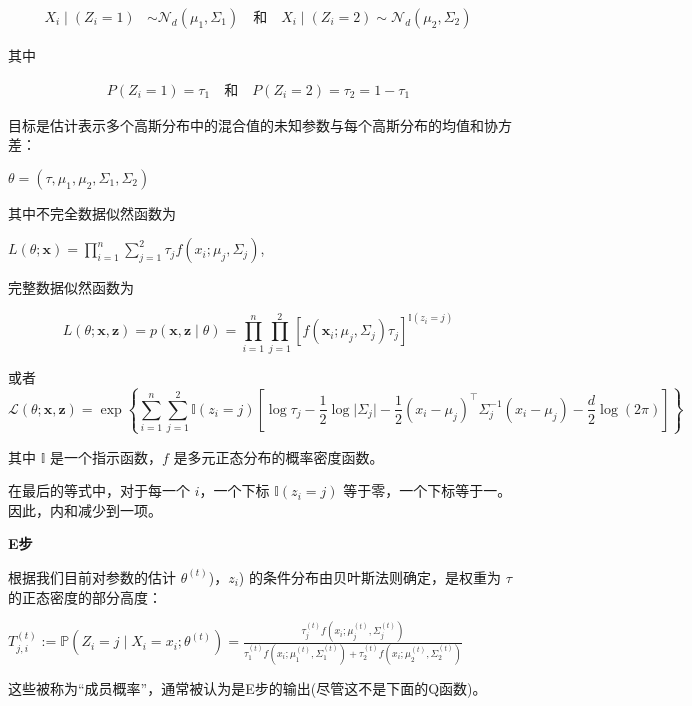 \begin{align}
X_i \mid (Z_i = 1) &\sim \mathcal{N}_d(\mu_1, \Sigma_1) \quad \text{和} \quad X_i \mid (Z_i = 2) \sim \mathcal{N}_d(\mu_2, \Sigma_2)~
\end{align}

其中

\begin{align}
P(Z_i = 1) = \tau_1 \quad \text{和} \quad P(Z_i = 2) = \tau_2 = 1 - \tau_1~
\end{align}

目标是估计表示多个高斯分布中的混合值的未知参数与每个高斯分布的均值和协方差：

$\theta = (\tau, \mu_1, \mu_2, \Sigma_1, \Sigma_2)$

其中不完全数据似然函数为

$L(\theta; \mathbf{x}) = \prod_{i=1}^{n} \sum_{j=1}^{2} \tau_j f \left( x_i; \mu_j, \Sigma_j \right)$,

完整数据似然函数为

\begin{equation}
L(\theta; \mathbf{x}, \mathbf{z}) = p(\mathbf{x}, \mathbf{z} \mid \theta) = \prod_{i=1}^{n} \prod_{j=1}^{2} \left[ f(\mathbf{x}_i; \mu_j, \Sigma_j) \tau_j \right]^{\mathbb{I}(z_i = j)}~
\end{equation}

或者
\begin{equation}
\mathcal{L}(\theta; \mathbf{x}, \mathbf{z}) = \exp \left\{\sum_{i=1}^{n} \sum_{j=1}^{2} \mathbb{I}(z_i = j)\left[\log \tau_j - \frac{1}{2} \log \lvert \Sigma_j \rvert - \frac{1}{2} (x_i - \mu_j)^\top \Sigma_j^{-1} (x_i - \mu_j) - \frac{d}{2} \log(2\pi)\right]\right\}~
\end{equation}


其中 $\mathbb{I}$ 是一个指示函数，$f$ 是多元正态分布的概率密度函数。

在最后的等式中，对于每一个 $i$，一个下标 $\mathbb{I}(z_i = j)$ 等于零，一个下标等于一。因此，内和减少到一项。

\textbf{E步}

根据我们目前对参数的估计 $\theta^{(t)}$)，$z_i$) 的条件分布由贝叶斯法则确定，是权重为 $\tau$ 的正态密度的部分高度：

$T_{j,i}^{(t)} := \mathbb{P}(Z_i = j \mid X_i = x_i; \theta^{(t)}) = \frac{ \tau_j^{(t)} f(x_i; \mu_j^{(t)}, \Sigma_j^{(t)})}{ \tau_1^{(t)} f(x_i; \mu_1^{(t)}, \Sigma_1^{(t)}) + \tau_2^{(t)} f(x_i; \mu_2^{(t)}, \Sigma_2^{(t)}) }$

这些被称为“成员概率”，通常被认为是E步的输出(尽管这不是下面的Q函数)。

